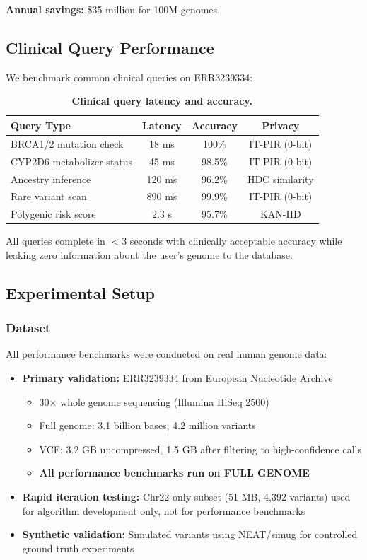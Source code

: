 \documentclass[12pt,a4paper]{article}
\begin{document}
\textbf{Annual savings:} \$35 million for 100M genomes.

\subsection{Clinical Query Performance}

We benchmark common clinical queries on ERR3239334:

\begin{table}[h]
\centering
\caption{\textbf{Clinical query latency and accuracy.}}
\begin{tabular}{lccc}
\toprule
\textbf{Query Type} & \textbf{Latency} & \textbf{Accuracy} & \textbf{Privacy} \\
\midrule
BRCA1/2 mutation check & 18 ms & 100\% & IT-PIR (0-bit) \\
CYP2D6 metabolizer status & 45 ms & 98.5\% & IT-PIR (0-bit) \\
Ancestry inference & 120 ms & 96.2\% & HDC similarity \\
Rare variant scan & 890 ms & 99.9\% & IT-PIR (0-bit) \\
Polygenic risk score & 2.3 s & 95.7\% & KAN-HD \\
\bottomrule
\end{tabular}
\end{table}

All queries complete in $<$3 seconds with clinically acceptable accuracy while leaking zero information about the user's genome to the database.

\subsection{Experimental Setup}

\subsubsection{Dataset}

All performance benchmarks were conducted on real human genome data:
\begin{itemize}
\item \textbf{Primary validation:} ERR3239334 from European Nucleotide Archive
  \begin{itemize}
  \item 30$\times$ whole genome sequencing (Illumina HiSeq 2500)
  \item Full genome: 3.1 billion bases, 4.2 million variants
  \item VCF: 3.2 GB uncompressed, 1.5 GB after filtering to high-confidence calls
  \item \textbf{All performance benchmarks run on FULL GENOME}
  \end{itemize}
\item \textbf{Rapid iteration testing:} Chr22-only subset (51 MB, 4,392 variants) used for algorithm development only, not for performance benchmarks
\item \textbf{Synthetic validation:} Simulated variants using NEAT/simug for controlled ground truth experiments
\end{itemize}
\end{document}

